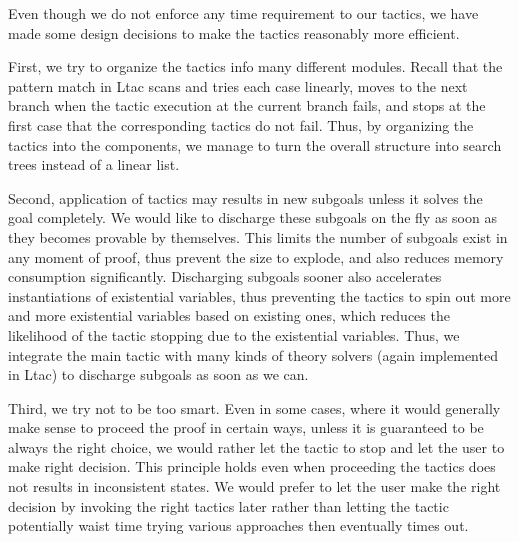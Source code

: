 Even though we do not enforce any time requirement to our tactics,
we have made some design decisions to make the tactics reasonably more
efficient.

First, we try to organize the tactics info many different modules.
Recall that the pattern match in Ltac scans and tries each case
linearly, moves to the next branch when the tactic execution
at the current branch fails, and stops at the first case that
the corresponding tactics do not fail. Thus, by organizing the
tactics into the components, we manage to turn the overall structure
into search trees instead of a linear list.

Second, application of tactics may results in new subgoals unless
it solves the goal completely. We would like to discharge these
subgoals on the fly as soon as they becomes provable by themselves.
This limits the number of subgoals exist in any moment of proof, thus
prevent the size to explode, and also reduces memory consumption
significantly. Discharging subgoals sooner also accelerates instantiations
of existential variables, thus preventing the tactics to spin out
more and more existential variables based on existing ones, which
reduces the likelihood of the tactic stopping due to the existential
variables. Thus, we integrate the main tactic with many kinds of theory solvers
(again implemented in Ltac) to discharge subgoals as soon as we can.

Third, we try not to be too smart. Even in some cases, where it would generally
make sense to proceed the proof in certain ways, unless it is guaranteed to
be always the right choice, we would rather let
the tactic to stop and let the user to make right decision. This principle
holds even when proceeding the tactics does not results in inconsistent states.
We would prefer to let the user make the right decision by invoking the right
tactics later rather than letting the tactic potentially waist time trying
various approaches then eventually times out.

